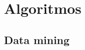 \section{Algoritmos}

%






\clearpage


\clearpage


\clearpage

\subsection{Data mining}
\clearpage



\newpage
\thispagestyle{empty}
\mbox{}


\newpage